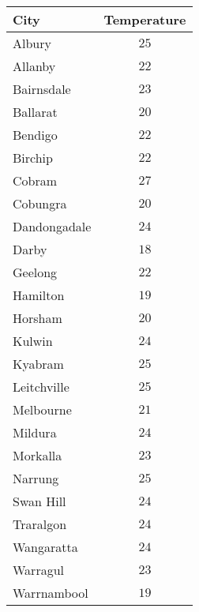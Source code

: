 \begin{tabular}{lc} \toprule
City         & Temperature \\\midrule
Albury       & $25$ \\
Allanby      & $22$ \\
Bairnsdale   & $23$ \\
Ballarat     & $20$ \\
Bendigo      & $22$ \\
Birchip      & $22$ \\
Cobram       & $27$ \\
Cobungra     & $20$ \\
Dandongadale & $24$ \\
Darby        & $18$ \\
Geelong      & $22$ \\
Hamilton     & $19$ \\
Horsham      & $20$ \\
Kulwin       & $24$ \\
Kyabram      & $25$ \\
Leitchville  & $25$ \\
Melbourne    & $21$ \\
Mildura      & $24$ \\
Morkalla     & $23$ \\
Narrung      & $25$ \\
Swan Hill    & $24$ \\
Traralgon    & $24$ \\
Wangaratta   & $24$ \\
Warragul     & $23$ \\
Warrnambool  & $19$ \\\bottomrule
\end{tabular}
